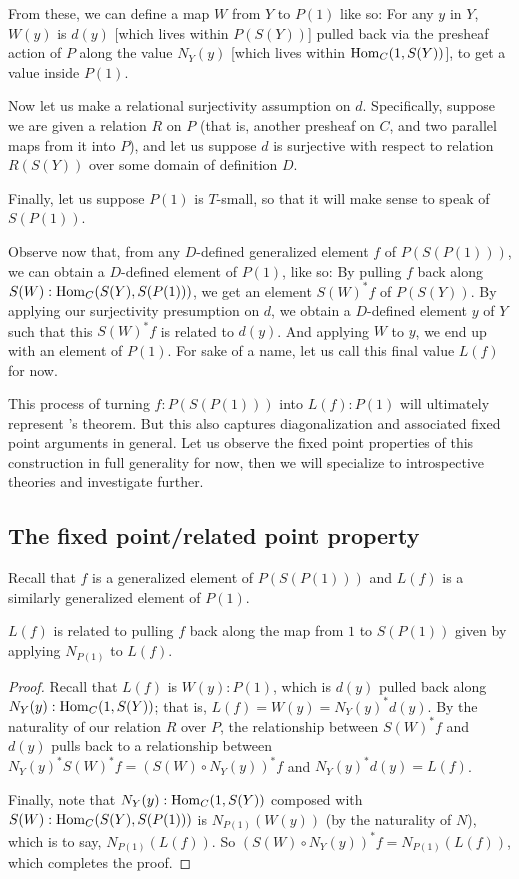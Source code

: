 From these, we can define a map $W$ from $Y$ to $P(1)$ like so: For any $y$ in $Y$, $W(y)$ is $d(y)$ [which lives within $P(S(Y))$] pulled back via the presheaf action of $P$ along the value $N_Y(y)$ [which lives within $\operatorname{Hom}_C(1, S(Y))$], to get a value inside $P(1)$.

Now let us make a relational surjectivity assumption on $d$. Specifically, suppose we are given a relation $R$ on $P$ (that is, another presheaf on $C$, and two parallel maps from it into $P$), and let us suppose $d$ is surjective with respect to relation $R(S(Y))$ over some domain of definition $D$.

Finally, let us suppose $P(1)$ is $T$-small, so that it will make sense to speak of $S(P(1))$.

Observe now that, from any $D$-defined generalized element $f$ of $P(S(P(1)))$, we can obtain a $D$-defined element of $P(1)$, like so: By pulling $f$ back along $S(W) : \operatorname{Hom}_C(S(Y), S(P(1)))$, we get an element $S(W)^*f$ of $P(S(Y))$. By applying our surjectivity presumption on $d$, we obtain a $D$-defined element $y$ of $Y$ such that this $S(W)^*f$ is related to $d(y)$. And applying $W$ to $y$, we end up with an element of $P(1)$. For sake of a name, let us call this final value $L(f)$ for now.

This process of turning $f: P(S(P(1)))$ into $L(f): P(1)$ will ultimately represent \Loeb's theorem. But this also captures diagonalization and associated fixed point arguments in general. Let us observe the fixed point properties of this construction in full generality for now, then we will specialize to introspective theories and investigate further.

\subsection{The fixed point/related point property}
Recall that $f$ is a generalized element of $P(S(P(1)))$ and $L(f)$ is a similarly generalized element of $P(1)$.
\begin{theorem}
$L(f)$ is related to pulling $f$ back along the map from $1$ to $S(P(1))$ given by applying $N_{P(1)}$ to $L(f)$.
\end{theorem}
\begin{proof}
Recall that $L(f)$ is $W(y) : P(1)$, which is $d(y)$ pulled back along $N_Y(y) : \operatorname{Hom}_C(1, S(Y))$; that is, $L(f) = W(y) = N_Y(y)^* d(y)$. By the naturality of our relation $R$ over $P$, the relationship between $S(W)^*f$ and $d(y)$ pulls back to a relationship between $N_Y(y)^* S(W)^*f = (S(W) \circ N_Y(y))^* f$ and $N_Y(y)^* d(y) = L(f)$.

Finally, note that $N_Y(y) : \operatorname{Hom}_C(1, S(Y))$ composed with $S(W) : \operatorname{Hom}_C(S(Y), S(P(1)))$ is $N_{P(1)}(W(y))$ (by the naturality of $N$), which is to say, $N_{P(1)}(L(f))$. So $(S(W) \circ N_Y(y))^* f = N_{P(1)}(L(f))$, which completes the proof.
\end{proof}

